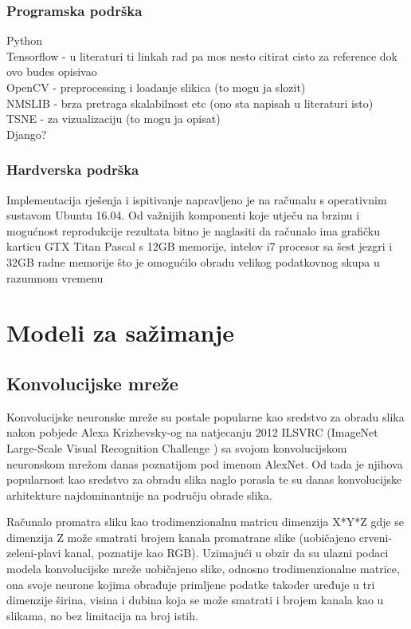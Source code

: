 \documentclass[times, utf8, proizvoljni, numeric]{fer}
\begin{document}
\subsection{Programska podrška}
\noindent Python \\
Tensorflow - u literaturi ti linkah rad pa mos nesto citirat cisto za reference dok ovo budes opisivao \cite{tensorflow2015-whitepaper}\\
OpenCV - preprocessing i loadanje slikica (to mogu ja slozit) \cite{itseez2015opencv}\\
NMSLIB - brza pretraga skalabilnost etc (ono sta napisah u literaturi isto) \cite{NMSLIB}\\
TSNE - za vizualizaciju (to mogu ja opisat) \cite{TSNE}\\
Django?\\

\subsection{Hardverska podrška}
Implementacija rješenja i ispitivanje napravljeno je na računalu s operativnim sustavom Ubuntu 16.04. Od važnijih komponenti koje utječu na brzinu i mogućnost reprodukcije rezultata bitno je naglasiti da računalo ima grafičku karticu GTX Titan Pascal s 12GB memorije, intelov i7 procesor sa šest jezgri i 32GB radne memorije što je omogućilo obradu velikog podatkovnog skupa u razumnom vremenu

\chapter{Modeli za sažimanje}

\section{Konvolucijske mreže}

Konvolucijske neuronske mreže su postale popularne kao sredstvo za obradu slika nakon pobjede Alexa Krizhevsky-og na natjecanju 2012 ILSVRC (ImageNet Large-Scale Visual Recognition Challenge \cite{ILSVRC15}) sa svojom konvolucijskom neuronskom mrežom danas poznatijom pod imenom AlexNet. Od tada je njihova popularnost kao sredstvo za obradu slika naglo porasla te su danas konvolucijske arhitekture najdominantnije na području obrade slika.

Računalo promatra sliku kao trodimenzionalnu matricu dimenzija X*Y*Z gdje se dimenzija Z može smatrati brojem kanala promatrane slike (uobičajeno crveni-zeleni-plavi kanal, poznatije kao RGB). Uzimajući u obzir da su ulazni podaci modela konvolucijske mreže uobičajeno slike, odnosno trodimenzionalne matrice, ona svoje neurone kojima obrađuje primljene podatke također uređuje u tri dimenzije širina, visina i dubina koja se može smatrati i brojem kanala kao u slikama, no bez limitacija na broj istih.
\end{document}
